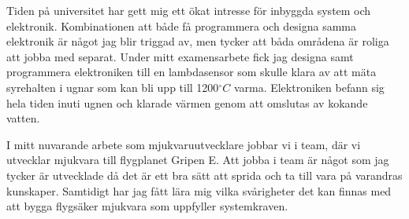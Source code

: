 \documentclass[11pt,a4paper,sans]{moderncv}        %
\begin{document}
Tiden på universitet har gett mig ett ökat intresse för inbyggda system och elektronik. Kombinationen att både få programmera och designa samma elektronik är något jag blir triggad av, men tycker att båda områdena är roliga att jobba med separat. Under mitt examensarbete fick jag designa samt programmera elektroniken till en lambdasensor som skulle klara av att mäta syrehalten i ugnar som kan bli upp till 1200$^\circ C$ varma. Elektroniken befann sig hela tiden inuti ugnen och klarade värmen genom att omslutas av kokande vatten.

I mitt nuvarande arbete som mjukvaruutvecklare jobbar vi i team, där vi utvecklar mjukvara till flygplanet Gripen E. Att jobba i team är något som jag tycker är utvecklade då det är ett bra sätt att sprida och ta till vara på varandras kunskaper. Samtidigt har jag fått lära mig vilka svårigheter det kan finnas med att bygga flygsäker mjukvara som uppfyller systemkraven.





\end{document}
